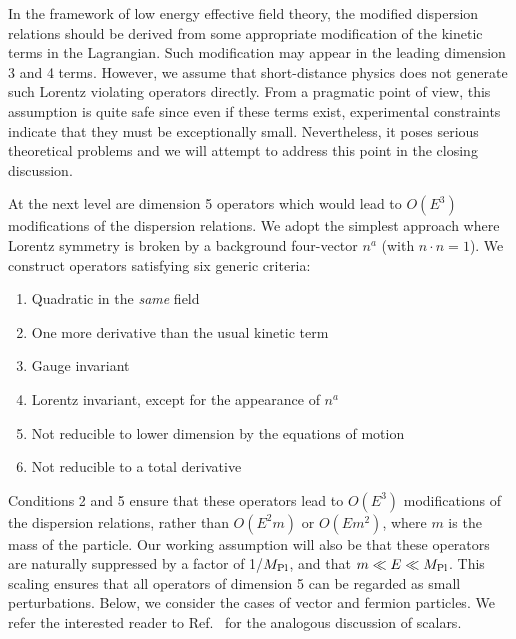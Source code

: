 \documentclass[12pt]{article}
\newcommand{\Mpl}{$M_{\rm {\small Pl}}$}
\begin{document}
In the framework of low energy effective field theory, the
modified dispersion relations should be derived from some
appropriate modification of the kinetic terms in the Lagrangian.
Such modification may appear in the leading dimension 3 and 4
terms. However, we assume that short-distance physics does not
generate such Lorentz violating operators directly. From a
pragmatic point of view, this assumption is quite safe since even
if these terms exist, experimental constraints indicate that they
must be exceptionally small\cite{Kost}. Nevertheless, it poses
serious theoretical problems and we will attempt to address this
point in the closing discussion.

At the next level are dimension 5 operators which would lead to
$O(E^3)$ modifications of the dispersion relations. We adopt the
simplest approach where Lorentz symmetry is broken by a background
four-vector $n^a$ (with $n\cdot n=1$). We construct operators
satisfying six generic criteria:
\begin{enumerate}
\item Quadratic in the {\it same} field
\item One more derivative than the usual kinetic term
\item Gauge invariant
\item Lorentz invariant, except for the appearance of $n^a$
\item Not reducible to lower dimension by the equations of motion
\item Not reducible to a total derivative
\end{enumerate}
Conditions 2 and 5 ensure that these operators lead to $O(E^3)$
modifications of the dispersion relations, rather than $O(E^2m)$
or $O(Em^2)$, where $m$ is the mass of the particle. Our working
assumption will also be that these operators are naturally
suppressed by a factor of 1/\Mpl, and that $m\ll E \ll M_{\rm
Pl}$. This scaling ensures that all operators of dimension 5 can
be regarded as small perturbations. Below, we consider the cases
of vector and fermion particles. We refer the interested reader to
Ref.~\cite{prl} for the analogous discussion of scalars.
\end{document}
